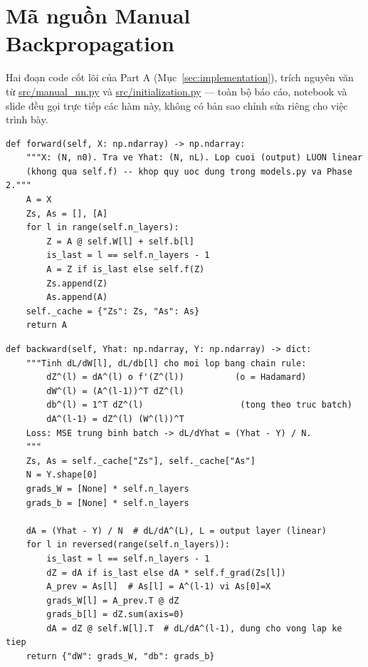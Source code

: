 \documentclass[12pt,a4paper]{article}
\begin{document}
{}
{\small }

\appendix

\section{Mã nguồn Manual Backpropagation}
\label{app:code}

Hai đoạn code cốt lõi của Part A (Mục~\ref{sec:implementation}), trích
nguyên văn từ \url{src/manual_nn.py} và \url{src/initialization.py} ---
toàn bộ báo cáo, notebook và slide đều gọi trực tiếp các hàm này, không
có bản sao chỉnh sửa riêng cho việc trình bày.

\begin{lstlisting}[caption={Forward pass -- src/manual\_nn.py}]
def forward(self, X: np.ndarray) -> np.ndarray:
    """X: (N, n0). Tra ve Yhat: (N, nL). Lop cuoi (output) LUON linear
    (khong qua self.f) -- khop quy uoc dung trong models.py va Phase 2."""
    A = X
    Zs, As = [], [A]
    for l in range(self.n_layers):
        Z = A @ self.W[l] + self.b[l]
        is_last = l == self.n_layers - 1
        A = Z if is_last else self.f(Z)
        Zs.append(Z)
        As.append(A)
    self._cache = {"Zs": Zs, "As": As}
    return A
\end{lstlisting}

\begin{lstlisting}[caption={Backward pass -- src/manual\_nn.py (nguyên văn công thức Mục~\ref{sec:matrixform})}]
def backward(self, Yhat: np.ndarray, Y: np.ndarray) -> dict:
    """Tinh dL/dW[l], dL/db[l] cho moi lop bang chain rule:
        dZ^(l) = dA^(l) o f'(Z^(l))          (o = Hadamard)
        dW^(l) = (A^(l-1))^T dZ^(l)
        db^(l) = 1^T dZ^(l)                   (tong theo truc batch)
        dA^(l-1) = dZ^(l) (W^(l))^T
    Loss: MSE trung binh batch -> dL/dYhat = (Yhat - Y) / N.
    """
    Zs, As = self._cache["Zs"], self._cache["As"]
    N = Y.shape[0]
    grads_W = [None] * self.n_layers
    grads_b = [None] * self.n_layers

    dA = (Yhat - Y) / N  # dL/dA^(L), L = output layer (linear)
    for l in reversed(range(self.n_layers)):
        is_last = l == self.n_layers - 1
        dZ = dA if is_last else dA * self.f_grad(Zs[l])
        A_prev = As[l]  # As[l] = A^(l-1) vi As[0]=X
        grads_W[l] = A_prev.T @ dZ
        grads_b[l] = dZ.sum(axis=0)
        dA = dZ @ self.W[l].T  # dL/dA^(l-1), dung cho vong lap ke tiep
    return {"dW": grads_W, "db": grads_b}
\end{lstlisting}
\end{document}
